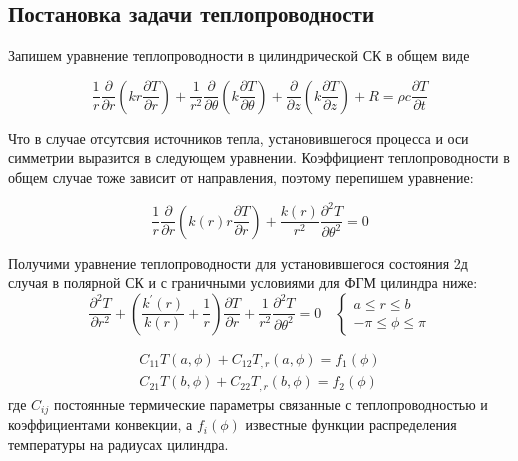 \subsection{Постановка задачи теплопроводности}
 \label{ch:ch2/sec2:sub1}
 
Запишем уравнение теплопроводности в цилиндрической СК в общем виде

\begin{equation*}
	\frac{1}{r} \frac{\partial}{\partial r} \left (k r \frac{\partial T}{\partial r} \right) + \frac{1}{r^2} \frac{\partial}{\partial \theta} \left (k \frac{\partial T}{\partial \theta} \right ) + \frac{\partial}{\partial z} \left (k \frac{\partial T}{\partial z} \right) + R = \rho c \frac{\partial T}{\partial t}
\end{equation*}

Что в случае отсутсвия источников тепла, установившегося процесса и оси симметрии выразится в следующем уравнении. Коэффициент теплопроводности в общем случае тоже зависит от направления, поэтому перепишем уравнение:

\begin{equation*}
	\frac{1}{r} \frac{\partial}{\partial r} \left (k(r) r \frac{\partial T}{\partial r} \right) + \frac{k(r)}{r^2}  \frac{\partial^2 T}{\partial \theta^2} = 0
\end{equation*}

Получими уравнение теплопроводности для установившегося состояния 2д случая в полярной СК и с граничными условиями для ФГМ цилиндра ниже:
\begin{equation}
	\label{eq:ch2:equation8}
	\frac{\partial^2 T}{\partial r^2} + \left ( \frac{ k^{\prime}(r)}{k(r)} + \frac{1}{r} \right )\frac{\partial T}{\partial r} + \frac{1}{r^2}\frac{\partial^2 T}{\partial \theta^2} = 0 \quad 
	\begin{cases}
		a \le r \le b \\
		 -\pi \le \phi \le \pi
		\end{cases}
\end{equation}

\begin{equation}
	\label{eq:ch2:equation9}
	\begin{split}
		C_{11} T(a, \phi) + C_{12} T_{,r}(a, \phi) = f_1 (\phi) \\
		C_{21} T(b, \phi) + C_{22} T_{,r}(b, \phi) = f_2 (\phi)
	\end{split}
\end{equation}
где \(C_{ij}\) постоянные термические параметры связанные с теплопроводностью и коэффициентами конвекции, а \(f_i(\phi)\) известные функции распределения температуры на радиусах цилиндра.

